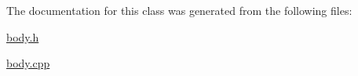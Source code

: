 The documentation for this class was generated from the following files\-:\begin{DoxyCompactItemize}
\item 
\hyperlink{body_8h}{body.\-h}\item 
\hyperlink{body_8cpp}{body.\-cpp}\end{DoxyCompactItemize}

